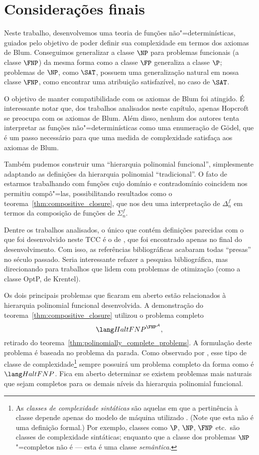 \section{Considerações finais}

Neste trabalho,
desenvolvemos uma teoria de funções não"=determinísticas,
guiados pelo objetivo de poder definir sua complexidade
em termos dos axiomas de Blum.
Conseguimos generalizar a classe $\NP$ para problemas funcionais
(a classe $\FNP$)
da mesma forma como a classe $\FP$ generaliza a classe $\P$;
problemas de $\NP$,
como $\SAT$,
possuem uma generalização natural em nossa classe $\FNP$,
como encontrar uma atribuição satisfazível, no caso de $\SAT$.

O objetivo de manter compatibilidade com os axiomas de Blum foi atingido.
É interessante notar que, dos trabalhos analisados neste capítulo,
apenas Hopcroft se preocupa com os axiomas de Blum.
Além disso,
nenhum dos autores tenta interpretar as funções não"=determinísticas
como uma enumeração de Gödel,
que é um passo necessário para que uma medida de complexidade
satisfaça aos axiomas de Blum.

Também pudemos construir uma ``hierarquia polinomial funcional'',
simplesmente adaptando as definições da hierarquia polinomial ``tradicional''.
O fato de estarmos trabalhando com funções
cujo domínio e contradomínio coincidem
nos permitiu compô"=las,
possibilitando resultados como o teorema~\ref{thm:compositive_closure},
que nos deu uma interpretação de $\Delta_n^f$
em termos da composição de funções de $\Sigma_n^f$.

Dentre os trabalhos analisados,
o único que contém definições parecidas com o que foi desenvolvido neste TCC
é o de \cite[p.~3]{Krentel1988},
que foi encontrado apenas no final do desenvolvimento.
Com isso,
as referências bibliográficas acabaram todas ``presas''
no século passado.
Seria interessante refazer a pesquisa bibliográfica,
mas direcionando para trabalhos que lidem com problemas de otimização
(como a classe OptP, de Krentel).

Os dois principais problemas que ficaram em aberto
estão relacionados à hierarquia polinomial funcional desenvolvida.
A demonstração do teorema~\ref{thm:compositive_closure}
utilizou o problema completo
\begin{equation*}
    \HaltFNP^{\FNP^\mathcal A},
\end{equation*}
retirado do teorema~\ref{thm:polinomially_complete_problems}.
A formulação deste problema é baseada no problema da parada.
Como observado por ,
esse tipo de classe de complexidade\footnote{
    As \emph{classes de complexidade sintáticas}
    são aquelas em que a pertinência à classe
    depende apenas do modelo de máquina utilizado
    \cite[p.~255]{Papadimitriou1994}.
    (Note que esta não é uma definição formal.)
    Por exemplo,
    classes como $\P$, $\NP$, $\FNP$ etc.\ são classes de complexidade sintáticas;
    enquanto que a classe dos problemas $\NP$"=completos não é
    --- esta é uma classe \emph{semântica}.
}
sempre possuirá um problema completo da forma como é $\HaltFNP$.
Fica em aberto determinar se existem problemas mais naturais
que sejam completos para os demais níveis da hierarquia polinomial funcional.

